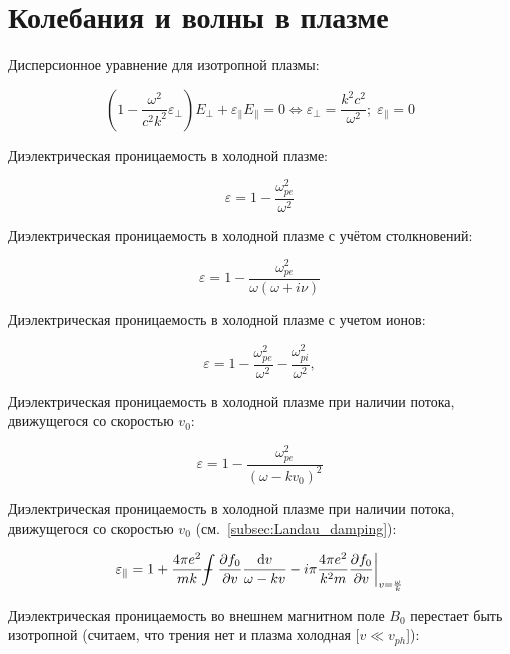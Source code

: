 \documentclass[10pt, a4paper]{article}
\def\Xint#1{\mathchoice
 {\XXint\displaystyle\textstyle{#1}}%
 {\XXint\textstyle\scriptstyle{#1}}%
 {\XXint\scriptstyle\scriptscriptstyle{#1}}%
 {\XXint\scriptscriptstyle\scriptscriptstyle{#1}}%
 \!\int}
\def\XXint#1#2#3{{\setbox0=\hbox{$#1{#2#3}{\int}$}
   \vcenter{\hbox{$#2#3$}}\kern-.5\wd0}}
\def\dashint{\Xint-}
\let\stdsection\section
\renewcommand\section{\newpage\stdsection}
\begin{document}
\section{Колебания и волны в плазме}

Дисперсионное уравнение для изотропной плазмы:

\begin{equation*}
	\left(1-\frac{\omega^2}{c^2 k^2} \varepsilon_\perp\right) E_\perp + \varepsilon_\parallel E_\parallel = 0 \Leftrightarrow \varepsilon_\perp = \frac{k^2c^2}{\omega^2};\;\varepsilon_\parallel = 0
\end{equation*}

Диэлектрическая проницаемость в холодной плазме:

\begin{equation*}
	\varepsilon = 1 - \frac{\omega_{pe}^2}{\omega^2}
\end{equation*}

Диэлектрическая проницаемость в холодной плазме с учётом столкновений:

\begin{equation*}
	\varepsilon = 1 - \frac{\omega_{pe}^2}{\omega(\omega+i\nu)}
\end{equation*}

Диэлектрическая проницаемость в холодной плазме с учетом ионов:

\begin{equation*}
	\varepsilon = 1 - \frac{\omega_{pe}^2}{\omega^2} - \frac{\omega_{pi}^2}{\omega^2},
\end{equation*}

Диэлектрическая проницаемость в холодной плазме при наличии потока, движущегося со скоростью $v_0$:

\begin{equation*}
	\varepsilon = 1-\frac{\omega_{pe}^2}{(\omega-kv_0)^2}
\end{equation*}

Диэлектрическая проницаемость в холодной плазме при наличии потока, движущегося со скоростью $v_0$ (см.~\ref{subsec:Landau_damping}):

\begin{equation*}
	\varepsilon_\parallel = 1 + \frac{4\pi e^2}{mk} \dashint\pdv{f_0}{v}\frac{\dd{v}}{\omega-kv} - i\pi \frac{4\pi e^2}{k^2m} \pdv{f_0}{v}\bigg|_{v = \frac{\omega}{k}}
\end{equation*}

Диэлектрическая проницаемость во внешнем магнитном поле $B_0$ перестает быть изотропной (считаем, что трения нет и плазма холодная [$v \ll v_{ph}$]):
\end{document}
